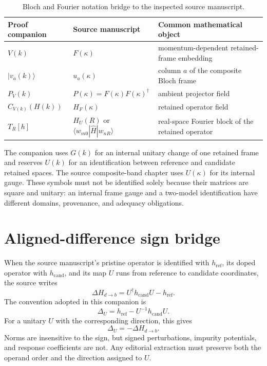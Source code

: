 \begin{table}[ht]
\centering
\small
\begin{tabularx}{\textwidth}{@{}l Y Y@{}}
\toprule
Proof companion & Source manuscript & Common mathematical object \\
\midrule
$V(k)$
  & $F(\kappa)$
  & momentum-dependent retained-frame embedding \\
$|v_a(k)\rangle$
  & $u_a(\kappa)$
  & column $a$ of the composite Bloch frame \\
$P_V(k)$
  & $P(\kappa)=F(\kappa)F(\kappa)^\dagger$
  & ambient projector field \\
$C_{V(k)}(H(k))$
  & $H_F(\kappa)$
  & retained operator field \\
$T_R[h]$
  & $H_U(R)$ or $\langle w_{m0}|\widehat H|w_{nR}\rangle$
  & real-space Fourier block of the retained operator \\
\bottomrule
\end{tabularx}
\caption{Bloch and Fourier notation bridge to the inspected source manuscript.}
\label{tab:bloch-manuscript-notation-bridge}
\end{table}

The companion uses $G(k)$ for an internal unitary change of one retained frame and
reserves $U(k)$ for an identification between reference and candidate retained spaces.
The source composite-band chapter uses $U(\kappa)$ for its internal gauge. These symbols
must not be identified solely because their matrices are square and unitary: an internal
frame gauge and a two-model identification have different domains, provenance, and
adequacy obligations.

\section{Aligned-difference sign bridge}

When the source manuscript's pristine operator is identified with
$h_{\mathrm{ref}}$, its doped operator with $h_{\mathrm{cand}}$, and its map $U$ runs
from reference to candidate coordinates, the source writes
\[
  \Delta H_{d\to b}=U^\dagger h_{\mathrm{cand}}U-h_{\mathrm{ref}}.
\]
The convention adopted in this companion is
\[
  \Delta_U=h_{\mathrm{ref}}-U^{-1}h_{\mathrm{cand}}U.
\]
For a unitary $U$ with the corresponding direction, this gives
\[
  \Delta_U=-\Delta H_{d\to b}.
\]
Norms are insensitive to the sign, but signed perturbations, impurity potentials, and
response coefficients are not. Any editorial extraction must preserve both the operand
order and the direction assigned to $U$.


